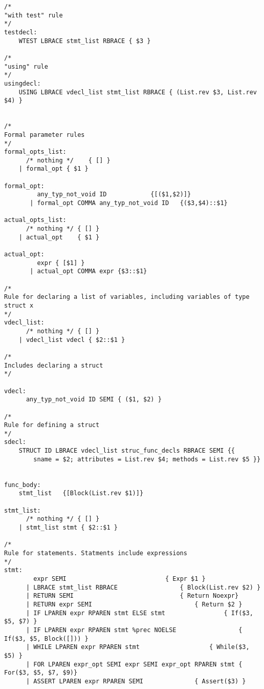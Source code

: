 \documentclass{article}
\begin{document}
\begin{lstlisting}
/* 
"with test" rule 
*/
testdecl:
	WTEST LBRACE stmt_list RBRACE { $3 }

/* 
"using" rule 
*/
usingdecl:
	USING LBRACE vdecl_list stmt_list RBRACE { (List.rev $3, List.rev $4) }


/*
Formal parameter rules
*/
formal_opts_list:
	  /* nothing */    { [] }
	| formal_opt { $1 }

formal_opt:
	     any_typ_not_void ID 			{[($1,$2)]}
	   | formal_opt COMMA any_typ_not_void ID 	{($3,$4)::$1}

actual_opts_list:
	  /* nothing */ { [] }
	| actual_opt 	{ $1 }

actual_opt:
	     expr { [$1] }
	   | actual_opt COMMA expr {$3::$1}

/* 
Rule for declaring a list of variables, including variables of type struct x 
*/
vdecl_list: 
	  /* nothing */ { [] }
	| vdecl_list vdecl { $2::$1 }

/*
Includes declaring a struct
*/

vdecl:
	  any_typ_not_void ID SEMI { ($1, $2) }

/* 
Rule for defining a struct 
*/
sdecl:
	STRUCT ID LBRACE vdecl_list struc_func_decls RBRACE SEMI {{
		sname = $2; attributes = List.rev $4; methods = List.rev $5 }}


func_body: 
	stmt_list 	{[Block(List.rev $1)]}

stmt_list:
	  /* nothing */ { [] }
	| stmt_list stmt { $2::$1 }

/* 
Rule for statements. Statments include expressions 
*/
stmt:
	    expr SEMI 						    { Expr $1 }
	  | LBRACE stmt_list RBRACE				    { Block(List.rev $2) }
	  | RETURN SEMI					            { Return Noexpr}
	  | RETURN expr SEMI				            { Return $2 }
	  | IF LPAREN expr RPAREN stmt ELSE stmt 	            { If($3, $5, $7) }
	  | IF LPAREN expr RPAREN stmt %prec NOELSE 	       	    { If($3, $5, Block([])) }
	  | WHILE LPAREN expr RPAREN stmt 		       	    { While($3, $5) }
  	  | FOR LPAREN expr_opt SEMI expr SEMI expr_opt RPAREN stmt { For($3, $5, $7, $9)}
	  | ASSERT LPAREN expr RPAREN SEMI 			    { Assert($3) }


\end{lstlisting}
\end{document}
